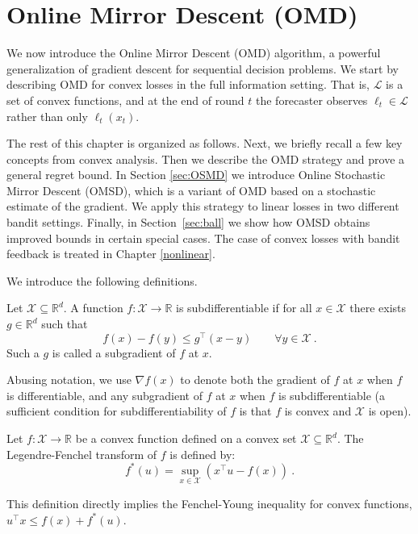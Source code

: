 \documentclass[11pt]{hackednow}
\newcommand{\R}{\mathbb{R}}
\newcommand{\cL}{\mathcal{L}}
\newcommand{\cX}{\mathcal{X}}
\begin{document}
\section{Online Mirror Descent (OMD)} \label{sec:OMD}
We now introduce the Online Mirror Descent (OMD) algorithm, a powerful generalization of gradient descent for sequential decision problems. We start by describing OMD for convex losses in the full information setting. That is, $\cL$ is a set of convex functions, and at the end of round $t$ the forecaster observes $\ell_t\in\cL$ rather than only $\ell_t(x_t)$. 

The rest of this chapter is organized as follows. Next, we briefly recall a few key concepts from convex analysis. Then we describe the OMD strategy and prove a general regret bound. In Section \ref{sec:OSMD} we introduce Online Stochastic Mirror Descent (OMSD), which is a variant of OMD based on a stochastic estimate of the gradient. We apply this strategy to linear losses in two different bandit settings. Finally, in Section~\ref{sec:ball} we show how OMSD obtains improved bounds in certain special cases. The case of convex losses with bandit feedback is treated in Chapter \ref{nonlinear}.

We introduce the following definitions.
\begin{definition}
Let $\cX\subseteq\R^d$.
A function $f : \cX \to \R$ is subdifferentiable if for all $x \in \cX$ there exists $g \in \R^d$ such that
$$f(x) - f(y) \leq g^{\top} (x-y) \qquad\forall y \in \cX~.$$
Such a $g$ is called a subgradient of $f$ at $x$.
\end{definition}
Abusing notation, we use $\nabla f(x)$ to denote both the gradient of $f$ at $x$ when $f$ is differentiable, and any subgradient of $f$ at $x$ when $f$ is subdifferentiable (a sufficient condition for subdifferentiability of $f$ is that $f$ is convex and $\cX$ is open).
\begin{definition}
Let $f : \cX \rightarrow \R$ be a convex function defined on a convex set $\cX\subseteq\R^d$. The Legendre-Fenchel transform of $f$ is defined by:
$$f^*(u) = \sup_{x \in \cX} \left(x^{\top} u - f(x)\right)~.$$
\end{definition}
This definition directly implies the Fenchel-Young inequality for convex functions,
$u^{\top} x \leq f(x) + f^*(u)$.
\end{document}
